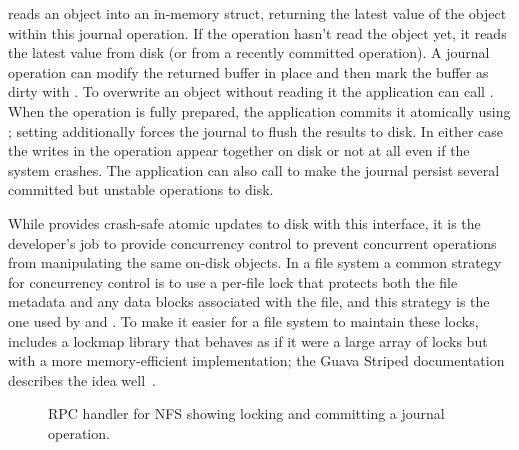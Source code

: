  reads an object into an in-memory  struct, returning the latest value of the
object within this journal operation.  If the operation hasn't read the
object yet, it reads the latest value from disk (or from a recently
committed operation).  A journal operation can modify the returned buffer in place and
then mark the buffer as dirty with . To overwrite an object without
reading it the application can call . When the operation is
fully prepared, the application commits it atomically using ; setting
 additionally forces the journal to flush the results to disk.
In either case the writes in the operation appear together on disk or not at
all even if the system crashes. The application can also call  to
make the journal persist several committed but unstable operations to disk.

While \txn provides crash-safe atomic updates to disk with this interface, it is the developer's job
to provide concurrency control to prevent concurrent operations from manipulating
the same on-disk objects. In a file system a common strategy for concurrency
control is to use a per-file lock that protects both the file metadata and any
data blocks associated with the file, and this strategy is the one
used by \gnfs and \simplenfs.
To make it easier for a file system to maintain these locks,
\txn includes a lockmap library that behaves as if it were a large array of
locks but with a more memory-efficient implementation; the
Guava Striped documentation describes the idea well~\cite{guava-striped}.


\begin{figure}
  
  \vspace{-\baselineskip}
  \caption{RPC handler for NFS  showing locking and committing a
    journal operation.}
  \label{fig:nfswrite}
\end{figure}

%   

%  

